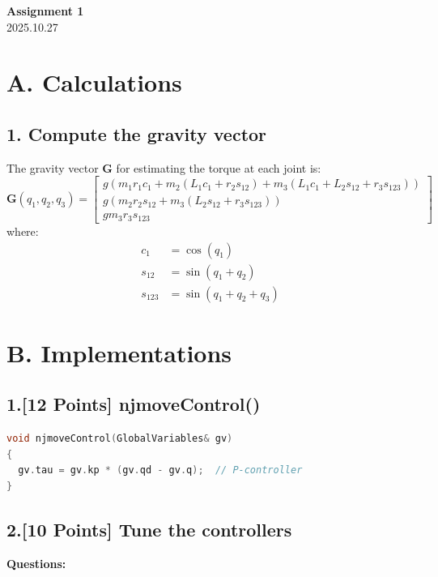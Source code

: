 \documentclass[a4paper,12pt]{article}
\begin{document}
\begin{center}
    \Large \textbf{Assignment 1} \\[6pt]
    2025.10.27
\end{center}

\section*{A. Calculations}
\subsection*{1. Compute the gravity vector}
The gravity vector $\mathbf{G}$ for estimating the torque at each joint is:
\[
\mathbf{G}(q_1, q_2, q_3) =
\begin{bmatrix}
g(m_1 r_1 c_1 + m_2(L_1 c_1 + r_2 s_{12}) + m_3(L_1 c_1 + L_2 s_{12} + r_3 s_{123})) \\
g(m_2 r_2 s_{12} + m_3(L_2 s_{12} + r_3 s_{123})) \\
g m_3 r_3 s_{123}
\end{bmatrix}
\]
where:
\[
\begin{aligned}
c_1 &= \cos(q_1) \\
s_{12} &= \sin(q_1 + q_2) \\
s_{123} &= \sin(q_1 + q_2 + q_3)
\end{aligned}
\]

\section*{B. Implementations}
\subsection*{1.[12 Points] njmoveControl() }

\begin{lstlisting}[language=C++]
void njmoveControl(GlobalVariables& gv)
{
  gv.tau = gv.kp * (gv.qd - gv.q);  // P-controller
}
\end{lstlisting}

\subsection*{2.[10 Points] Tune the controllers }

\noindent\textbf{Questions:}
\end{document}
